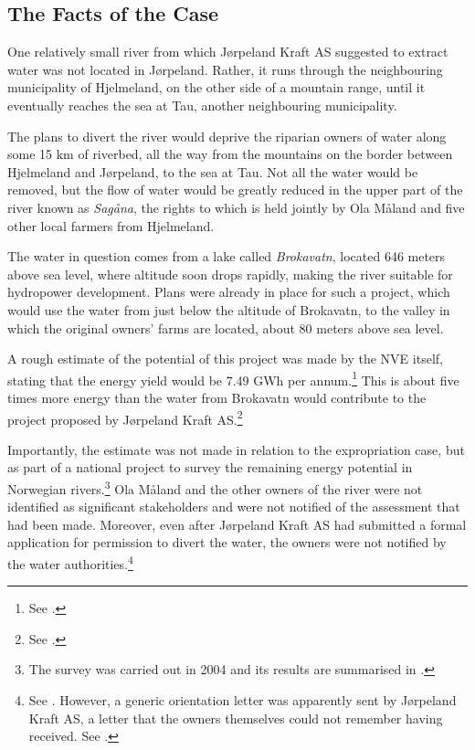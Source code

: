 \subsection{The Facts of the Case}

One relatively small river from which Jørpeland Kraft AS suggested to extract water was not located in Jørpeland. Rather, it runs through the neighbouring municipality of Hjelmeland, on the other side of a mountain range, until it eventually reaches the sea at Tau, another neighbouring municipality. 

The plans to divert the river would deprive the riparian owners of water along some 15 km of riverbed, all the way from the mountains on the border between Hjelmeland and Jørpeland, to the sea at Tau. Not all the water would be removed, but the flow of water would be greatly reduced in the upper part of the river known as {\it Sagåna}, the rights to which is held jointly by Ola Måland and five other local farmers from Hjelmeland.

The water in question comes from a lake called \emph{Brokavatn}, located 646 meters above sea level, where altitude soon drops rapidly, making the river suitable for hydropower development. Plans were already in place for such a project, which would use the water from just below the altitude of Brokavatn, to the valley in which the original owners' farms are located, about 80 meters above sea level. 

A rough estimate of the potential of this project was made by the NVE itself, stating that the energy yield would be 7.49 GWh per annum.\footnote{See \cite[16]{jorpeland09}.} This is about five times more energy than the water from Brokavatn would contribute to the project proposed by Jørpeland Kraft AS.\footnote{See \cite[19]{jorpeland09}.}

Importantly, the estimate was not made in relation to the expropriation case, but as part of a national project to survey the remaining energy potential in Norwegian rivers.\footnote{The survey was carried out in 2004 and its results are summarised in \cite{jensen04}.} Ola Måland and the other owners of the river were not identified as significant stakeholders and were not notified of the assessment that had been made. Moreover, even after Jørpeland Kraft AS had submitted a formal application for permission to divert the water, the owners were not notified by the water authorities.\footnote{See \cite[16]{jorpeland09}. However, a generic orientation letter was apparently sent by Jørpeland Kraft AS, a letter that the owners themselves could not remember having received. See \cite[5|8]{jorpeland11a}.}

